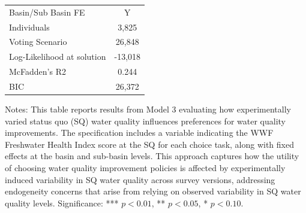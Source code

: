 {\begin{table}[H]
{\begin{tabular}{lll}
\midrule
  Basin/Sub Basin FE & \multicolumn{2}{c}{Y}  \\ 
  Individuals & \multicolumn{2}{c}{3,825}  \\ 
  Voting Scenario & \multicolumn{2}{c}{26,848}  \\ 
  Log-Likelihood at solution & \multicolumn{2}{c}{-13,018}  \\ 
  McFadden’s R2 & \multicolumn{2}{c}{0.244}  \\ 
  BIC & \multicolumn{2}{c}{26,372}  \\ 
   \midrule
\end{tabular}
}
\begin{minipage}{16cm}  
\singlespacing  
\vspace{0.01cm}  
\footnotesize Notes: This table reports results from Model 3 evaluating how experimentally varied status quo (SQ) water 
quality influences preferences for water quality improvements. The specification includes a variable indicating the WWF 
Freshwater Health Index score at the SQ for each choice task, along with fixed effects at the basin and sub-basin levels. 
This approach captures how the utility of choosing water quality improvement policies is affected by experimentally induced 
variability in SQ water quality across survey versions, addressing endogeneity concerns that arise from relying on observed 
variability in SQ water quality levels.
Significance: *** $p < 0.01$, ** $p < 0.05$, * $p < 0.10$. 
\end{minipage}
\end{table}
}
